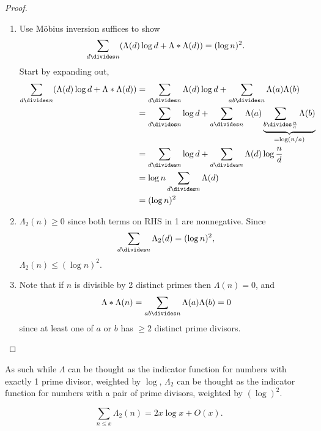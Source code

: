 \documentclass[a4paper]{article}
\theoremstyle{definition}
\begin{document}
\begin{proof}\leavevmode
  \begin{enumerate}
  \item Use Möbius inversion suffices to show
    \[
      \sum_{d \divides n} (\Lambda(d) \log d + \Lambda * \Lambda(d)) = (\log n)^2.
    \]
    Start by expanding out,
    \begin{align*}
      \sum_{d \divides n} (\Lambda(d) \log d + \Lambda * \Lambda(d))
      &= \sum_{d \divides n} \Lambda(d) \log d + \sum_{ab \divides n} \Lambda(a) \Lambda(b) \\
      &= \sum_{d \divides n} \log d + \sum_{a \divides n} \Lambda(a) \underbrace{\sum_{b \divides \frac{n}{a}} \Lambda(b)}_{= \log (n/a)} \\
      &= \sum_{d \divides n} \log d + \sum_{d \divides n} \Lambda(d) \log \frac{n}{d} \\
      &= \log n \sum_{d \divides n} \Lambda(d) \\
      &= (\log n)^2
    \end{align*}
  \item \(\Lambda_2(n) \geq 0\) since both terms on RHS in 1 are nonnegative. Since
    \[
      \sum_{d \divides n} \Lambda_2(d) = (\log n)^2,
    \]
    \(\Lambda_2(n) \leq (\log n)^2\).
  \item Note that if \(n\) is divisible by 2 distinct primes then \(\Lambda(n) = 0\), and
    \[
      \Lambda * \Lambda(n) = \sum_{ab \divides n} \Lambda(a) \Lambda(b) = 0
    \]
    since at least one of \(a\) or \(b\) has \(\geq 2\) distinct prime divisors.
  \end{enumerate}
\end{proof}

As such while \(\Lambda\) can be thought as the indicator function for numbers with exactly 1 prime divisor, weighted by \(\log\), \(\Lambda_2\) can be thought as the indicator function for numbers with a pair of prime divisors, weighted by \((\log)^2\).

\begin{theorem}[Selberg]
  \[
    \sum_{n \leq x} \Lambda_2(n) = 2x \log x + O(x).
  \]
\end{theorem}
\end{document}
